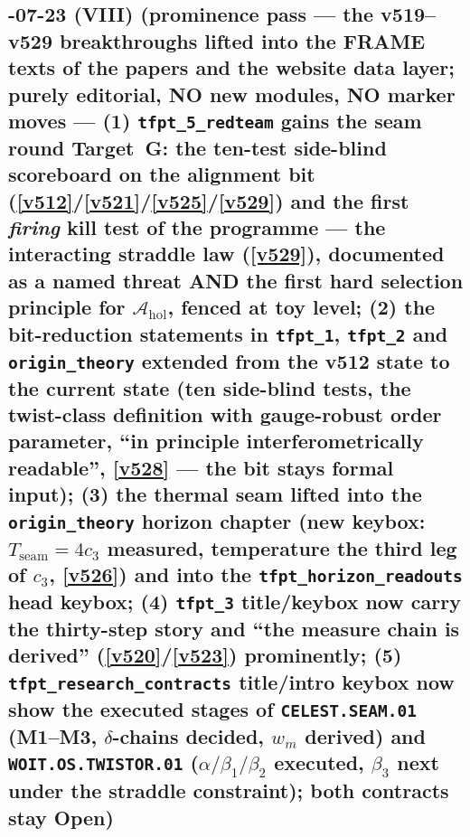 \subsection*{-07-23 (VIII) (prominence pass --- the v519--v529 breakthroughs lifted into the FRAME texts of the papers and the website data layer; purely editorial, NO new modules, NO marker moves --- (1) \texttt{tfpt\_5\_redteam} gains the seam round Target~G: the ten-test side-blind scoreboard on the alignment bit (\vref{v512}/\vref{v521}/\vref{v525}/\vref{v529}) and the first \emph{firing} kill test of the programme --- the interacting straddle law (\vref{v529}), documented as a named threat AND the first hard selection principle for $\mathcal A_{\mathrm{hol}}$, fenced at toy level; (2) the bit-reduction statements in \texttt{tfpt\_1}, \texttt{tfpt\_2} and \texttt{origin\_theory} extended from the v512 state to the current state (ten side-blind tests, the twist-class definition with gauge-robust order parameter, ``in principle interferometrically readable'', \vref{v528} --- the bit stays formal input); (3) the thermal seam lifted into the \texttt{origin\_theory} horizon chapter (new keybox: $T_{\mathrm{seam}}=4c_3$ measured, temperature the third leg of $c_3$, \vref{v526}) and into the \texttt{tfpt\_horizon\_readouts} head keybox; (4) \texttt{tfpt\_3} title/keybox now carry the thirty-step story and ``the measure chain is derived'' (\vref{v520}/\vref{v523}) prominently; (5) \texttt{tfpt\_research\_contracts} title/intro keybox now show the executed stages of \texttt{CELEST.SEAM.01} (M1--M3, $\delta$-chains decided, $w_m$ derived) and \texttt{WOIT.OS.TWISTOR.01} ($\alpha/\beta_1/\beta_2$ executed, $\beta_3$ next under the straddle constraint); both contracts stay Open)}
